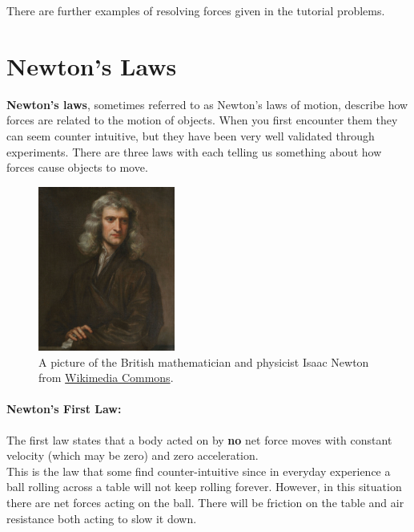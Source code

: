 \documentclass[a4paper,12pt]{book}
\begin{document}
There are further examples of resolving forces given in the tutorial problems.

\section{Newton's Laws}
\textbf{Newton's laws}, sometimes referred to as Newton's laws of motion, describe how forces are related to the motion of objects. When you first encounter them they can seem counter intuitive, but they have been very well validated through experiments. There are three laws with each telling us something about how forces cause objects to move.

\begin{figure}[ht]
    \centering
    \includegraphics[width=0.4\textwidth]{figures/Portrait_of_Sir_Isaac_Newton,_1689.jpg}
    \caption{A picture of the British mathematician and physicist Isaac Newton from \href{https://commons.wikimedia.org/wiki/File:Portrait_of_Sir_Isaac_Newton,_1689.jpg}{Wikimedia Commons}.}
\end{figure}

\paragraph{Newton's First Law:} The first law states that a body acted on by \textbf{no} net force moves with constant velocity (which may be zero) and zero acceleration. \\

This is the law that some find counter-intuitive since in everyday experience a ball rolling across a table will not keep rolling forever. However, in this situation there are net forces acting on the ball. There will be friction on the table and air resistance both acting to slow it down.\\
\end{document}
